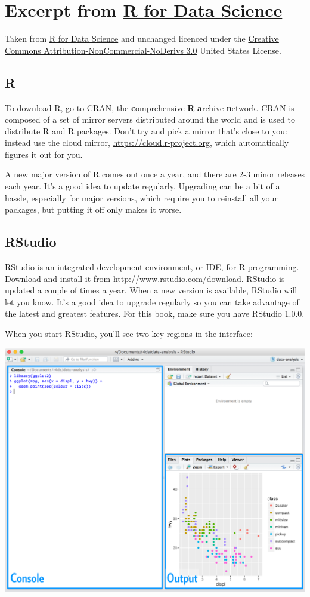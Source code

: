 \documentclass[]{book}
\theoremstyle{definition}
\theoremstyle{definition}
\theoremstyle{remark}
\begin{document}
\section{\texorpdfstring{Excerpt from
\href{http://r4ds.had.co.nz/index.html}{R for Data
Science}}{Excerpt from R for Data Science}}\label{excerpt-from-r-for-data-science}

Taken from \href{http://r4ds.had.co.nz/index.html}{R for Data Science}
and unchanged licenced under the
\href{http://creativecommons.org/licenses/by-nc-nd/3.0/us/}{Creative
Commons Attribution-NonCommercial-NoDerivs 3.0} United States License.

\subsection{R}\label{r}

To download R, go to CRAN, the \textbf{c}omprehensive \textbf{R}
\textbf{a}rchive \textbf{n}etwork. CRAN is composed of a set of mirror
servers distributed around the world and is used to distribute R and R
packages. Don't try and pick a mirror that's close to you: instead use
the cloud mirror, \url{https://cloud.r-project.org}, which automatically
figures it out for you.

A new major version of R comes out once a year, and there are 2-3 minor
releases each year. It's a good idea to update regularly. Upgrading can
be a bit of a hassle, especially for major versions, which require you
to reinstall all your packages, but putting it off only makes it worse.

\subsection{RStudio}\label{rstudio}

RStudio is an integrated development environment, or IDE, for R
programming. Download and install it from
\url{http://www.rstudio.com/download}. RStudio is updated a couple of
times a year. When a new version is available, RStudio will let you
know. It's a good idea to upgrade regularly so you can take advantage of
the latest and greatest features. For this book, make sure you have
RStudio 1.0.0.

When you start RStudio, you'll see two key regions in the interface:

\includegraphics[width=0.75\linewidth]{images/rstudio-console}
\end{document}
